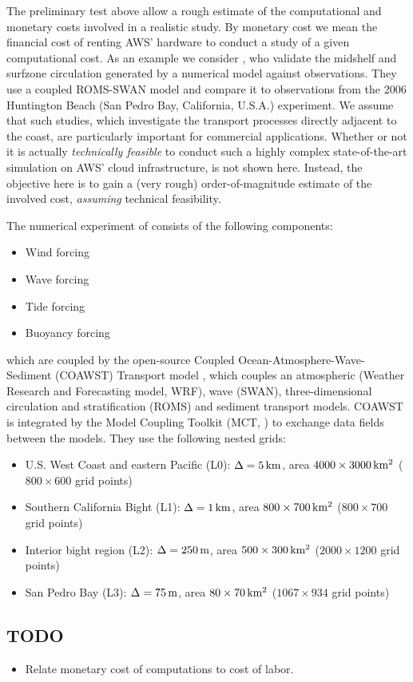 \documentclass[12pt,a4paper]{article}
\begin{document}
The preliminary test above allow a rough estimate of the computational and monetary costs involved in a realistic study. By monetary cost we mean the financial cost of renting AWS' hardware to conduct a study of a given computational cost. As an example we consider \cite{kumar2015midshelf}, who validate the midshelf and surfzone circulation generated by a numerical model against observations.  They use a coupled ROMS-SWAN model and compare it to observations from the 2006 Huntington Beach (San Pedro Bay, California, U.S.A.) experiment. We assume that such studies, which investigate the transport processes directly adjacent to the coast, are particularly important for commercial applications. Whether or not it is actually \emph{technically feasible} to conduct such a highly complex state-of-the-art simulation on AWS' cloud infrastructure, is not shown here. Instead, the objective here is to gain a (very rough) order-of-magnitude estimate of the involved cost, \emph{assuming} technical feasibility. 

The numerical experiment of \cite{kumar2015midshelf} consists of the following components:

\begin{itemize}
	\item Wind forcing
	\item Wave forcing
	\item Tide forcing
	\item Buoyancy forcing
\end{itemize}

which are coupled by the open-source Coupled Ocean-Atmosphere-Wave-Sediment (COAWST) Transport model \citep{warner2008using,web:coawst}, which couples an atmospheric (Weather Research and Forecasting model, WRF), wave (SWAN), three-dimensional circulation and stratification (ROMS) and sediment transport models. COAWST is integrated by the Model Coupling Toolkit (MCT, \citealt{web:mct}) to exchange data fields between the models. They use the following nested grids:

\begin{itemize}
	\item U.S. West Coast and eastern Pacific (L0):  $\Delta=5\,\rm km$, area $4000\times3000\,\rm km^2$ ($800\times600$ grid points)
	\item Southern California Bight (L1):  $\Delta=1\,\rm km$, area $800\times700\,\rm km^2$ ($800\times700$ grid points)
	\item Interior bight region (L2): $\Delta=250\,\rm m$, area $500\times300\,\rm km^2$ ($2000\times1200$ grid points)
	\item San Pedro Bay (L3): $\Delta=75\,\rm m$, area $80\times70\,\rm km^2$ ($1067\times934$ grid points)
\end{itemize}

\subsection{TODO}

\begin{itemize}
	\item Relate monetary cost of computations to cost of labor.
\end{itemize}

	


\end{document}

